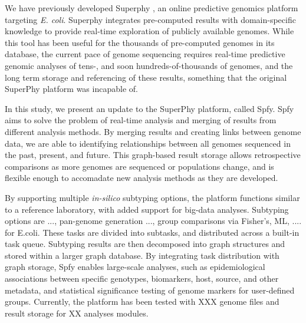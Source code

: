 \documentclass[a4,center,fleqn]{NAR}
\begin{document}
We have previously developed Superphy \cite{whiteside2016superphy}, an online predictive genomics platform targeting \textit{E. coli}. Superphy integrates pre-computed results with domain-specific knowledge to provide real-time exploration of publicly available genomes. While this tool has been useful for the thousands of pre-computed genomes in its database, the current pace of genome sequencing requires real-time predictive genomic analyses of tens-, and soon hundreds-of-thousands of genomes, and the long term storage and referencing of these results, something that the original SuperPhy platform was incapable of.


In this study, we present an update to the SuperPhy platform, called Spfy. Spfy aims to solve the problem of real-time analysis and merging of results from different analysis methods. By merging results and creating links between genome data, we are able to identifying relationships between all genomes sequenced in the past, present, and future. This graph-based result storage allows retrospective comparisons as more genomes are sequenced or populations change, and is flexible enough to accomadate new analysis methods as they are developed.


By supporting multiple \textit{in-silico} subtyping options, the platform functions similar to a reference laboratory, with added support for big-data analyses. Subtyping options are ..., pan-genome generation ..., group comparisons via Fisher's, ML, .... for E.coli. These tasks are divided into subtasks, and distributed across a built-in task queue. Subtyping results are then decomposed into graph structures and stored within a larger graph database. By integrating task distribution with graph storage, Spfy enables large-scale analyses, such as epidemiological associations between specific genotypes, biomarkers, host, source, and other metadata, and statistical significance testing of genome markers for user-defined groups. Currently, the platform has been tested with XXX genome files and result storage for XX analyses modules.
\end{document}

